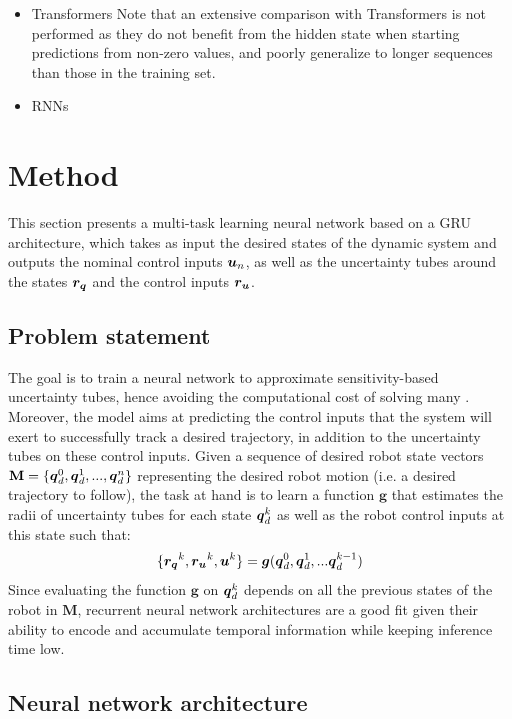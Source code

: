 \begin{itemize}
    \item Transformers
    Note that an extensive comparison with Transformers \cite{cTrans} is not performed as they do not benefit from the hidden state when starting predictions from non-zero values, and poorly generalize to longer sequences than those in the training set.
    \item RNNs
\end{itemize}

\section{Method} \label{sec:method}

This section presents a multi-task learning neural network based on a GRU architecture, which takes as input the desired states of the dynamic system and outputs the nominal control inputs $\boldsymbol{u}_n$, as well as the uncertainty tubes around the states $\boldsymbol{r_q}$ and the control inputs $\boldsymbol{r_u}$. 

\subsection{Problem statement}

The goal is to train a neural network to approximate sensitivity-based uncertainty tubes, hence avoiding the computational cost of solving many . 
Moreover, the model aims at predicting the control inputs that the system will exert to successfully track a desired trajectory, in addition to the uncertainty tubes on these control inputs. 
Given a sequence of desired robot state vectors $\textbf{M} = \{\boldsymbol{q}_{d}^0, \boldsymbol{q}_{d}^1, ..., \boldsymbol{q}_{d}^n\}$ representing the desired robot motion (i.e. a desired trajectory to follow), the task at hand is to learn a function $\boldsymbol{g}$ that estimates the radii of uncertainty tubes for each state $\boldsymbol{q}_{d}^k$ as well as the robot control inputs at this state such that:
\begin{equation}\label{eq:prob_statement}
\{\boldsymbol{r_q}^{k}, \boldsymbol{r_u}^{k},\boldsymbol{u}^{k}\} = \boldsymbol{g}(\boldsymbol{q}_{d}^0, \boldsymbol{q}_{d}^1, ... \boldsymbol{q}_{d}^{k-1})
\end{equation}
Since evaluating the function $\boldsymbol{g}$ on $\boldsymbol{q}_{d}^k$ depends on all the previous states of the robot in $\textbf{M}$, recurrent neural network architectures are a good fit given their ability to encode and accumulate temporal information while keeping inference time low.

\subsection{Neural network architecture}\label{sec:architecture}

